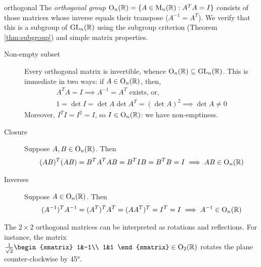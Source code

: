 \begin{example}{}{orthogonal}
The \emph{orthogonal group} $\mathrm{O}_n(\mathbb{R})=\{A\in\mathrm{M}_n(\mathbb{R}):A^TA=I\}$ consists of those matrices whose inverse equals their transpose ($A^{-1}=A^T$). We verify that this is a subgroup of $\mathrm{GL}_n(\mathbb{R})$ using the subgroup criterion (Theorem \ref{thm:subgroup}) and simple matrix properties.
	\begin{description}
	  \item[Non-empty subset] Every orthogonal matrix is invertible, whence $\mathrm{O}_n(\mathbb{R})\subseteq\mathrm{GL}_n(\mathbb{R})$. This is immediate in two ways: if $A\in\mathrm{O}_n(\mathbb{R})$, then,
	  \begin{gather*}
	  	A^TA=I\implies A^{-1}=A^T \text{ exists, \ or,}\\
	  	1=\det I=\det A\det A^T=(\det A)^2\implies \det A\neq 0
	  \end{gather*}
	  Moreover, $I^TI=I^2=I$, so $I\in\mathrm{O}_n(\mathbb{R})$: we have non-emptiness.
	  \item[Closure] Suppose $A,B\in\mathrm{O}_n(\mathbb{R})$. Then
	  \begin{gather*}
	  	(AB)^T(AB)=B^TA^TAB=B^TIB=B^TB=I \implies AB\in\mathrm{O}_n(\mathbb{R})
	  \end{gather*}
	  \item[Inverses] Suppose $A\in\mathrm{O}_n(\mathbb{R})$. Then
	  \begin{gather*}
	  	(A^{-1})^TA^{-1}=(A^T)^TA^T=(AA^T)^T=I^T=I\implies A^{-1}\in\mathrm{O}_n(\mathbb{R})
	  \end{gather*}
	\end{description}
	The $2\times 2$ orthogonal matrices can be interpreted as rotations and reflections.\footnotemark{} For instance, the matrix $\frac 1{\sqrt 2}
	\begin{smatrix}
		1&-1\\
		1&1
	\end{smatrix}
	\in\rO_2(\R)$ rotates the plane counter-clockwise by \ang{45}.
\end{example}



